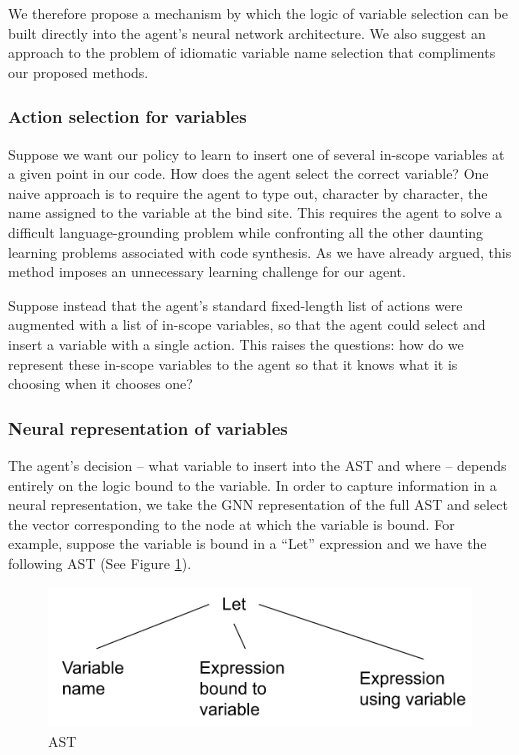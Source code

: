 \documentclass{article}
\begin{document}
\hspace{16}We therefore propose a mechanism by which the logic of variable selection can be built directly into the agent’s neural network architecture. We also suggest an approach to the problem of idiomatic variable name selection that compliments our proposed methods.

\subsubsection{Action selection for variables}
\hspace{16}Suppose we want our policy to learn to insert one of several in-scope variables at a given point in our code. How does the agent select the correct variable? One naive approach is to require the agent to type out, character by character, the name assigned to the variable at the bind site. This requires the agent to solve a difficult language-grounding problem while confronting all the other daunting learning problems associated with code synthesis. As we have already argued, this method imposes an unnecessary learning challenge for our agent.

\hspace{16}Suppose instead that the agent’s standard fixed-length list of actions were augmented with a list of in-scope variables, so that the agent could select and insert a variable with a single action. This raises the questions: how do we represent these in-scope variables to the agent so that it knows what it is choosing when it chooses one?

\subsubsection{Neural representation of variables}
\label{sec:neural-representation}
\hspace{16}The agent’s decision – what variable to insert into the AST and where – depends entirely on the logic bound to the variable. In order to capture information in a neural representation, we take the GNN representation of the full AST and select the vector corresponding to the node at which the variable is bound. For example, suppose the variable is bound in a “Let” expression and we have the following AST (See Figure \ref{fig:ast}).

\begin{figure}[htbp]
\centerline{\includegraphics[width=1\linewidth]{img/ast.png}}
    \caption{AST}
    \label{fig:ast}
\end{figure}
\end{document}
